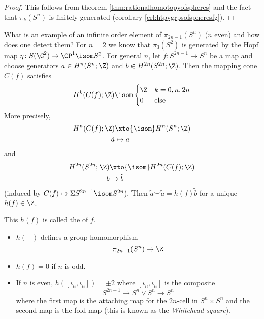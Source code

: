 \begin{proof}
	This follows from theorem \ref{thm:rationalhomotopyofspheres} and the fact that $\pi_k(S^n)$ is finitely generated (corollary \ref{crl:htpygrpsofspheresfg}).
\end{proof}
What is an example of an infinite order element of $\pi_{2n - 1}(S^n)$ ($n$ even) and how does one detect them?
For $n = 2$ we know that $\pi_3(S^2)$ is generated by the Hopf map $\eta\colon S(\C^2) \to \CP^1 \isom S^2$.
For general $n$, let $f\colon S^{2n - 1} \to S^n$ be a map and choose generators $a \in H^n(S^n; \Z)$ and $b \in H^{2n}(S^{2n}; \Z)$.
Then the mapping cone $C(f)$ satisfies
\begin{equation*}
	H^k(C(f); \Z) \isom \begin{cases}
		\Z 	& k = 0, n, 2n \\
		0 	& \text{else}
	\end{cases}
\end{equation*}
More precisely,
\begin{align*}
	H^n(C(f); \Z) &\xto{\isom} H^n(S^n; \Z) \\
	\tilde{a} &\mapsto a
\end{align*}
and
\begin{align*}
	H^{2n}(S^{2n}; \Z) &\xto{\isom} H^{2n}(C(f); \Z) \\
	b &\mapsto \tilde{b}
\end{align*}
(induced by $C(f) \mapsto \Sigma S^{2n - 1} \isom S^{2n}$).
Then $\tilde{a} \smile \tilde{a} = h(f) \tilde{b}$ for a unique $h(f) \in \Z$.
\begin{definition}
	This $h(f)$ is called the  of $f$.
\end{definition}
\begin{lemma}
	\leavevmode	
	\begin{itemize}
		\item $h({{-}})$ defines a group homomorphism
			\begin{equation*}
				\pi_{2n - 1}(S^n) \to \Z
			\end{equation*}
		\item $h(f) = 0$ if $n$ is odd.
		\item If $n$ is even, $h([\iota_n, \iota_n]) = \pm 2$ where $[\iota_n, \iota_n]$ is the composite
			\begin{equation*}
				S^{2n - 1} \to S^n \vee S^n \to S^n
			\end{equation*}
			where the first map is the attaching map for the $2n$-cell in $S^n \times S^n$ and the second map is the fold map (this is known as the \emph{Whitehead square}).
	\end{itemize}
\end{lemma}
